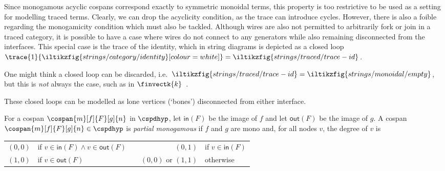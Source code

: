 Since monogamous acyclic cospans correspond exactly to symmetric monoidal terms,
this property is too restrictive to be used as a setting for modelling traced
terms.
Clearly, we can drop the acyclicity condition, as the trace can introduce
cycles.
However, there is also a foible regarding the monogamicity condition which must
also be tackled.
Although wires are also not permitted to arbitrarily fork or join in a traced
category, it is possible to have a case where wires do not connect to
any generators while also remaining disconnected from the interfaces.
This special case is the trace of the identity, which in string diagrams is
depicted as a closed
loop \(
\trace{1}{\iltikzfig{strings/category/identity}[colour=white]}
=
\iltikzfig{strings/traced/trace-id}
\).

\begin{remark}
    One might think a closed loop can be discarded, i.e.\ \(
    \iltikzfig{strings/traced/trace-id}
    =
    \iltikzfig{strings/monoidal/empty}
    \), but this is \emph{not} always the case, such as in
    \(\finvectk{k}\)~\cite[Sec. 6.1]{hasegawa1997recursion}.
\end{remark}

These closed loops can be modelled as lone vertices (`bones') disconnected from
either interface.

\begin{definition}
    For a cospan \(\cospan{m}[f]{F}[g]{n}\) in
    \(\cspdhyp\), let \(\mathsf{in}(F)\) be the image of \(f\) and let
    \(\mathsf{out}(F)\) be the image of \(g\).
    A cospan \(\cospan{m}[f]{F}[g]{n} \in \cspdhyp\) is
    \emph{partial monogamous} if \(f\) and \(g\) are mono and, for all nodes
    \(v\), the degree of \(v\) is
    \begin{center}
        \begin{tabular}{rlcrl}
            \((0,0)\)
             &
            if \(v \in \mathsf{in}(F) \wedge v \in \mathsf{out}(F)\)
             &
            \quad
             &
            \((0,1)\)
             &
            if \(v \in \mathsf{in}(F)\)
            \\
            \((1,0)\)
             &
            if \(v \in \mathsf{out}(F)\)
             &
            \quad
             &
            \((0,0)\)
            or \((1,1)\)
             &
            otherwise
        \end{tabular}
    \end{center}
\end{definition}

